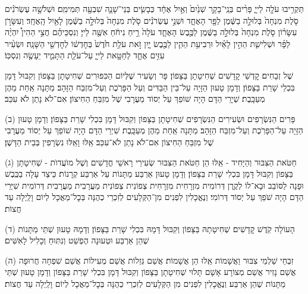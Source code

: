 \documentclass[twoside, openany, parskip=half, 11pt]{book}
\begin{document}
תַּקְרִ֥יבוּ עֹלָ֖ה לַייָ֑ פָּרִ֨ים בְּנֵֽי־בָקָ֤ר שְׁנַ֙יִם֙ וְאַ֣יִל אֶחָ֔ד כְּבָשִׂ֧ים בְּנֵי־שָׁנָ֛ה שִׁבְעָ֖ה תְּמִימִֽם׃
וּשְׁלֹשָׁ֣ה עֶשְׂרֹנִ֗ים סֹ֤לֶת מִנְחָה֙ בְּלוּלָ֣ה בַשֶּׁ֔מֶן לַפָּ֖ר הָאֶחָ֑ד וּשְׁנֵ֣י עֶשְׂרֹנִ֗ים סֹ֤לֶת מִנְחָה֙ בְּלוּלָ֣ה בַשֶּׁ֔מֶן לָאַ֖יִל הָֽאֶחָֽד׃
וְעִשָּׂרֹ֣ן עִשָּׂר֗וֹן סֹ֤לֶת מִנְחָה֙ בְּלוּלָ֣ה בַשֶּׁ֔מֶן לַכֶּ֖בֶשׂ הָאֶחָ֑ד עֹלָה֙ רֵ֣יחַ נִיחֹ֔חַ אִשֶּׁ֖ה לַייָ׃
וְנִסְכֵּיהֶ֗ם חֲצִ֣י הַהִין֩ יִהְיֶ֨ה לַפָּ֜ר וּשְׁלִישִׁ֧ת הַהִ֣ין לָאַ֗יִל וּרְבִיעִ֥ת הַהִ֛ין לַכֶּ֖בֶשׂ יָ֑יִן זֹ֣את עֹלַ֥ת חֹ֙דֶשׁ֙ בְּחׇדְשׁ֔וֹ לְחׇדְשֵׁ֖י הַשָּׁנָֽה׃
וּשְׂעִ֨יר עִזִּ֥ים אֶחָ֛ד לְחַטָּ֖את לַייָ֑ עַל־עֹלַ֧ת הַתָּמִ֛יד יֵעָשֶׂ֖ה וְנִסְכּֽוֹ׃

%
שֶׁל זְבָחִים׃ קׇדְשֵׁי קׇדָשִׁים שְׁחִיטָתָן בַּצָּפוֹן׃ פָּר וְשָׂעִיר שֶׁלְּיוֹם הַכִּפּוּרִים שְׁחִיטָתָן בַּצָּפוֹן וְקִבּוּל דָּמָן בִּכְלֵי שָׁרֵת בַּצָּפוֹן׃ וְדָמָן טָעוּן הַזָּיָה עַל־בֵּין הַבַּדִּים וְעַל הַפָּרֹֽכֶת וְעַל־מִזְבַּח הַזָּהָב׃ מַתָּנָה אַֽחַת מֵהֶן מְעַכָּֽבֶת׃ שְׁיָרֵי הַדָּם הָיָה שׁוֹפֵךְ עַל יְסוֹד מַעֲרָבִי שֶׁל מִזְבֵּחַ הַחִיצוֹן׃ אִם־לֹא נָתַן לֹא עִכֵּב׃

(ב) פָּרִים הַנִּשְׂרָפִים וּשְׂעִירִים הַנִּשְׂרָפִים שְׁחִיטָתָן בַּצָּפוֹן וְקִבּוּל דָּמָן בִּכְלִי שָׁרֵת בַּצָּפוֹן׃ וְדָמָן טָעוּן הַזָּיָה עַל־הַפָּרֹֽכֶת וְעַל־מִזְבַּח הַזָּהָב׃ מַתָּנָה אַֽחַת מֵהֶן מְעַכָּֽבֶת׃ שִׁיְרֵי הַדָּם הָיָה שׁוֹפֵךְ עַל יְסוֹד מַעֲרָבִי שֶׁל מִזְבֵּחַ הַחִיצוֹן אִם־לֹא נָתַן לֹא־עִכֵּב׃ אֵֽלּוּ וָאֵֽלּוּ נִשְׂרָפִין בְּבֵית הַדָּשֶׁן׃

(ג) חַטֹּאת הַצִּבּוּר וְהַיָּחִיד - אֵֽלּוּ הֵן חַטֹּאת הַצִּבּוּר שְׂעִירֵי רָאשֵׁי חֳדָשִׁים וְשֶׁל מוׁעֲדוׂת - שְׁחִיטָתָן בַּצָּפוֹן וְקִבּוּל דָּמָן בִּכְלִי שָׁרֵת בַּצָּפוֹן׃ וְדָמָן טָעוּן אַרְבַּע מַתָּנוֹת עַל אַרְבַּע קְרָנוֹת׃ כֵּיצַד עָלָה בַכֶּֽבֶשׁ וּפָנָה לַסּוֹבֵב וּבָא־לוֹ לְקֶֽרֶן דְּרוֹמִית מִזְרָחִית מִזְרָחִית צְפוֹנִית צְפוֹנִית מַעֲרָבִית מַעֲרָבִית דְּרוֹמִית שִׁיְּרֵי הַדָּם הָיָה שֹׁפֵךְ עַל יְסוֹד דְּרוֹמִי׃ וְנֶאֱכָלִין לִפְנִים מִן־הַקְּלָעִים לְזִכְרֵי כְהֻנָּה בְּכׇל־מַאֲכָל לְיוֹם וָלַֽיְלָה עַד חֲצוֹת׃

(ד) הָעוֹלָה קֹֽדֶשׁ קׇדָשִׁים׃ שְׁחִיטָתָהּ בַּצָּפוֹן וְקִבּוּל דָּמָהּ בִּכְלִי שָׁרֵת בַּצָּפוֹן׃ וְדָמָהּ טָעוּן שְׁתֵּי מַתָּנוֹת שֶׁהֵן אַרְבַּע וּטְעוּנָה הֶפְשֵׁט וְנִתּֽוּחַ וְכָלִיל לָאִשִּׁים׃

(ה) זִבְחֵי שַׁלְמֵי צִבּוּר וַאֲשָׁמוֹת אֵֽלוּ הֵן אֲשָׁמוֹת׃ אֲשַׁם גְּזֵלוֹת אֲשַׁם מְעִילוֹת אֲשַׁם שִׁפְחָה חֲרוּפָה אֲשַׁם נָזִיר אֲשַׁם מְצוֹרָע אָשָׁם תָּלוּי שְׁחִיטָתָן בַּצָּפוֹן וְקִבּוּל דָּמָן בִּכְלִי שָׁרֵת בַּצָּפוֹן וְדָמָן טָעוּן שְׁתֵּי מַתָּנוֹת שֶׁהֵן אַרְבַּע׃ וְנֶאֱכָלִין לִפְנִים מִן הַקְּלָעִים לְזִכְרֵי כְהֻנָּה בְּכׇל־מַאֲכָל לְיוֹם וָלַֽיְלָה עַד חֲצוֹת׃
\end{document}
